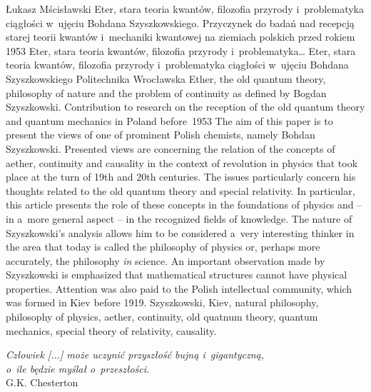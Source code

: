 \begin{artplenv}{Łukasz Mścisławski}
	{Eter, stara teoria kwantów, filozofia przyrody i~problematyka ciągłości w~ujęciu Bohdana Szyszkowskiego. Przyczynek do badań nad recepcją starej teorii kwantów i~mechaniki kwantowej na ziemiach polskich przed rokiem 1953}
	{Eter, stara teoria kwantów, filozofia przyrody i~problematyka\ldots}
	{Eter, stara teoria kwantów, filozofia przyrody i~problematyka ciągłości w~ujęciu Bohdana Szyszkowskiego}
	{Politechnika Wrocławska}
	{Ether, the old quantum theory, philosophy of nature and the problem of continuity as defined by Bogdan Szyszkowski. Contribution to research on the reception of the old quantum theory and quantum mechanics in Poland before~1953}
	{The aim of this paper is to present the views of one of prominent Polish chemists, namely Bohdan Szyszkowski. Presented views are concerning the relation of the concepts of aether, continuity and causality in the context of revolution in physics that took place at the turn of 19th and 20th centuries. The issues particularly concern his thoughts related to the old quantum theory and special relativity. In particular, this article presents the role of these concepts in the foundations of physics and -- in a~more general aspect -- in the recognized fields of knowledge. The nature of Szyszkowski's analysis allows him to be considered a~very interesting thinker in the area that today is called the philosophy of physics or, perhaps more accurately, the philosophy \textit{in} science. An important observation made by Szyszkowski is emphasized that mathematical structures cannot have physical properties. Attention was also paid to the Polish intellectual community, which was formed in Kiev before 1919.}
	{Szyszkowski, Kiev, natural philosophy, philosophy of physics, aether, continuity, old quatnum theory, quantum mechanics, special theory of relativity, causality.}


\begin{flushright}
\textit{Człowiek [...] może uczynić przyszłość bujną i~gigantyczną,\\
o~ile będzie myślał o~przeszłości.\\}
G.K. Chesterton
\end{flushright}



\end{artplenv}
